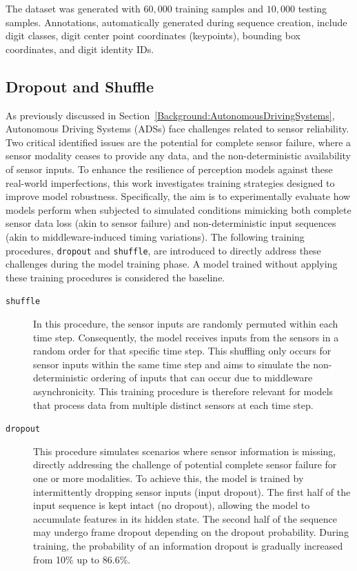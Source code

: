 The dataset was generated with $60,000$ training samples and $10,000$ testing samples. Annotations, automatically generated during sequence creation, include digit classes, digit center point coordinates (keypoints), bounding box coordinates, and digit identity IDs.

\subsection{Dropout and Shuffle} \label{Methods:DropoutAndShuffle}

As previously discussed in Section~\ref{Background:AutonomousDrivingSystems}, Autonomous Driving Systems (ADSs) face challenges related to sensor reliability. Two critical identified issues are the potential for complete sensor failure, where a sensor modality ceases to provide any data, and the non-deterministic availability of sensor inputs. To enhance the resilience of perception models against these real-world imperfections, this work investigates training strategies designed to improve model robustness. Specifically, the aim is to experimentally evaluate how models perform when subjected to simulated conditions mimicking both complete sensor data loss (akin to sensor failure) and non-deterministic input sequences (akin to middleware-induced timing variations). The following training procedures, \texttt{dropout} and \texttt{shuffle}, are introduced to directly address these challenges during the model training phase. A model trained without applying these training procedures is considered the baseline.

\begin{description}
    \item[\texttt{shuffle}] In this procedure, the sensor inputs are randomly permuted within each time step. Consequently, the model receives inputs from the sensors in a random order for that specific time step. This shuffling only occurs for sensor inputs within the same time step and aims to simulate the non-deterministic ordering of inputs that can occur due to middleware asynchronicity. This training procedure is therefore relevant for models that process data from multiple distinct sensors at each time step.    
    \item[\texttt{dropout}] This procedure simulates scenarios where sensor information is missing, directly addressing the challenge of potential complete sensor failure for one or more modalities. To achieve this, the model is trained by intermittently dropping sensor inputs (input dropout). The first half of the input sequence is kept intact (no dropout), allowing the model to accumulate features in its hidden state. The second half of the sequence may undergo frame dropout depending on the dropout probability. During training, the probability of an information dropout is gradually increased from 10\% up to 86.6\%.
\end{description}

